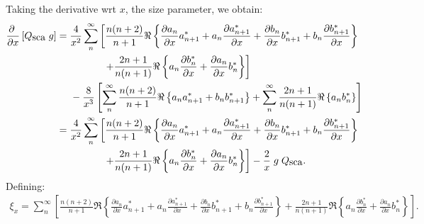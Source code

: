 \documentclass[a4paper,10pt]{article}
\def \Qsca { {Q_{\mbox{\rm sca}}}}
\def \asym { {g} }
\begin{document}
Taking the derivative wrt $x$, the size parameter, we obtain:
\begin{align}
 \frac{\partial\;}{\partial x} \left[\Qsca \; \asym \right] &=
 \frac{4}{x^2}\sum_n^\infty \left[  \frac{n(n+2)}{n+1} \Re \left\{
                                                                \frac{\partial a_n}{\partial x} a^*_{n+1} +
                                                                a_n \frac{\partial a^*_{n+1}}{\partial x}  +
                                                                \frac{\partial b_n}{\partial x} b^*_{n+1}  +
                                                                b_n \frac{\partial b^*_{n+1}}{\partial x}
                                                       \right\} \right. \nonumber \\
                             & \;\;\;\;\;\;\;\;\;\;\;\; \;\;\;\;\;
                               \left.+ \frac{2n+1}{n(n+1)} \Re \left\{ a_n \frac{\partial b^*_n}{\partial x} +
                                    \frac{\partial a_n}{\partial x} b^*_n  \right\}\right]  \nonumber\\
                      &\;\;\;\;\; - \frac{8}{x^3} \left[   \sum_n^\infty \frac{n(n+2)}{n+1} \Re \left\{ a_na^*_{n+1} +  b_n b^*_{n+1}  \right\}
                                    +  \sum_n^\infty \frac{2n+1}{n(n+1)} \Re \left\{ a_n b^*_n \right\}\right] \\
        &=\frac{4}{x^2}\sum_n^\infty \left[  \frac{n(n+2)}{n+1} \Re \left\{
                                                                \frac{\partial a_n}{\partial x} a^*_{n+1} +
                                                                a_n \frac{\partial a^*_{n+1}}{\partial x}  +
                                                                \frac{\partial b_n}{\partial x} b^*_{n+1}  +
                                                                b_n \frac{\partial b^*_{n+1}}{\partial x}
                                                       \right\} \right. \nonumber \\
                             & \;\;\;\;\;\;\;\;\;\;\;\; \;\;\;\;\;
                               \left.+ \frac{2n+1}{n(n+1)} \Re \left\{ a_n \frac{\partial b^*_n}{\partial x} +
                                    \frac{\partial a_n}{\partial x} b^*_n  \right\}\right]  - \frac{2}{x} \; \asym \; \Qsca.
\end{align}
Defining:
\begin{align}
\xi_x=\sum_n^\infty \left[  \frac{n(n+2)}{n+1} \Re \left\{
                                                                \frac{\partial a_n}{\partial x} a^*_{n+1} +
                                                                a_n \frac{\partial a^*_{n+1}}{\partial x}  +
                                                                \frac{\partial b_n}{\partial x} b^*_{n+1}  +
                                                                b_n \frac{\partial b^*_{n+1}}{\partial x}
                                                       \right\}
                               + \frac{2n+1}{n(n+1)} \Re \left\{ a_n \frac{\partial b^*_n}{\partial x} +
                                    \frac{\partial a_n}{\partial x} b^*_n  \right\}\right].
\end{align}
\end{document}
